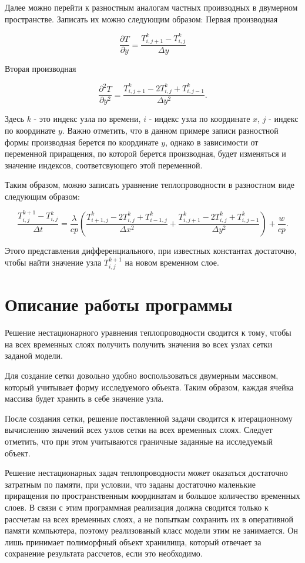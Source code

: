\documentclass[12pt, a4paper]{article}
\begin{document}
	Далее можно перейти к разностным аналогам частных проивзодных в двумерном пространстве. Записать их можно следующим образом:
	Первая производная
	
	\[
	\frac{\partial T}{\partial y} = \frac{T^k_{i, j + 1} - T^k_{i,j}}{\Delta y}
	\]
	
	Вторая производная
	
	\[
	\frac{\partial^2 T}{\partial y^2} = \frac{T^k_{i, j + 1} - 2T^k_{i,j} + T^k_{i,j-1}}{\Delta y^2}.
	\]
	
	Здесь $k$ - это индекс узла по времени, $i$ - индекс узла по координате $x$, $j$ - индекс по координате $y$.
	Важно отметить, что в данном примере записи разностной формы производная берется по координате $y$, однако в зависимости от переменной приращения, по которой берется производная, будет изменяться и значение индексов, соответсвующего этой переменной.
	
	Таким образом, можно записать уравнение теплопроводности в разностном виде следующим образом:
	
	\[
	\frac{T^{k + 1}_{i, j} - T^k_{i,j}}{\Delta t} = \frac{\lambda}{cp} \left( \frac{T^k_{i + 1, j} - 2T^k_{i,j} + T^k_{i - 1,j}}{\Delta x^2} + \frac{T^k_{i, j + 1} - 2T^k_{i,j} + T^k_{i,j-1}}{\Delta y^2} \right) + \frac{w}{cp}.
	\]
	
	Этого представления дифференциального, при известных константах достаточно, чтобы найти значение узла $T^{k+1}_{i,j}$ на новом временном слое.
	
	\section{Описание работы программы}
	
	Решение нестационарного уравнения теплопроводности сводится к тому, чтобы на всех временных слоях получить получить значения во всех узлах сетки заданой модели.
	
	Для создание сетки довольно удобно воспользоваться двумерным массивом, который учитывает форму исследуемого объекта. Таким образом, каждая ячейка массива будет хранить в себе значение узла.
	
	После создания сетки, решение поставленной задачи сводится к итерационному вычислению значений всех узлов сетки на всех временных слоях. Следует отметить, что при этом учитываются граничные заданные на исследуемый объект.
	
	Решение нестационарных задач теплопроводности может оказаться достаточно затратным по памяти, при условии, что заданы достаточно маленькие приращения по пространственным координатам и большое количество временных слоев. В связи с этим программная реализация должна сводится только к рассчетам на всех временных слоях, а не попыткам сохранить их в оперативной памяти компьютера, поэтому реализованый класс модели этим не занимается. Он лишь принимает полиморфный объект хранилища, который отвечает за сохранение результата рассчетов, если это необходимо.
	
\end{document}
